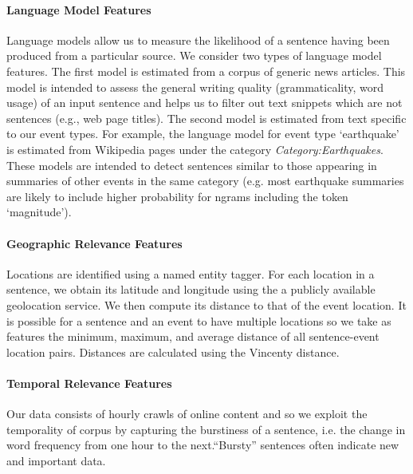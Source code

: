 \paragraph{Language Model Features}\label{subsubsec:lm}
Language models allow us to measure the likelihood of a sentence having been produced from a particular source.  We consider two types of language model features.  The first model is estimated from a corpus of generic news articles.  This model is intended to assess the general writing quality (grammaticality, word usage) of an input sentence and helps us to filter out text snippets which are not sentences (e.g., web page titles).  The second model is estimated from text specific to our event types.  For example, the language model for event type `earthquake' is estimated from Wikipedia pages under the category \emph{Category:Earthquakes}.  These models are intended to detect sentences similar to those appearing in summaries of other events in the same category (e.g. most earthquake summaries are likely to include higher probability for ngrams including the token `magnitude').  



\paragraph{Geographic Relevance Features}

Locations are identified using a named entity tagger. For each location in a sentence, we obtain its latitude and longitude using the a publicly available geolocation service.  We then compute its distance to that of the event location.  It is possible for a sentence and an event to have multiple locations so we take as features the minimum, maximum, and average distance of all sentence-event location pairs.  Distances are calculated using the Vincenty distance. 

\paragraph{Temporal Relevance Features}

Our data consists of hourly crawls of online content and so we exploit the temporality of corpus by capturing the burstiness of a sentence, i.e.  the change in word frequency from one hour to the next.``Bursty'' sentences often indicate new and important data. 

